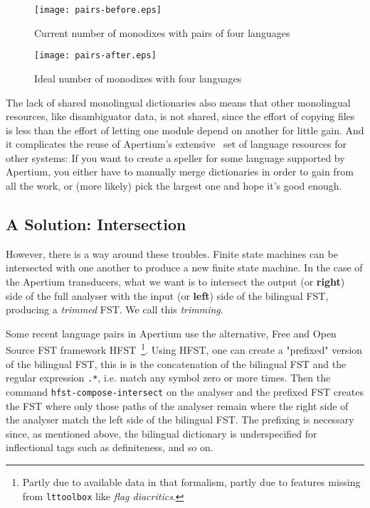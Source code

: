 \documentclass[10pt, a4paper]{article}
\newcommand{\tool}[1]{\texttt{#1}}
\begin{document}
\begin{figure}[h]
  \begin{center}
    \texttt{[image: pairs-before.eps]}
    \caption{Current number of monodixes with pairs of four languages}
    \label{fig.1}
  \end{center}
\end{figure}


\begin{figure}[h]
  \begin{center}
    \texttt{[image: pairs-after.eps]}
    \caption{Ideal number of monodixes with four languages}
    \label{fig.1}
  \end{center}
\end{figure}

The lack of shared monolingual dictionaries also means that other
monolingual resources, like disambiguator data, is not shared, since
the effort of copying files is less than the effort of letting one
module depend on another for little gain. And it complicates the reuse
of Apertium's extensive~\cite{tyers2010fosresources} set of language
resources for other systems: If you want to create a speller for some
language supported by Apertium, you either have to manually merge
dictionaries in order to gain from all the work, or (more likely) pick
the largest one and hope it's good enough.

\subsection{A Solution: Intersection}
\label{sec:solution}

However, there is a way around these troubles. Finite state machines
can be intersected with one another to produce a new finite state
machine. In the case of the Apertium transducers, what we want is to
intersect the output (or \textbf{right}) side of the full analyser
with the input (or \textbf{left}) side of the bilingual FST, producing
a \emph{trimmed} FST. We call this \emph{trimming}.

Some recent language pairs in Apertium use the alternative, Free and
Open Source FST framework HFST~\cite{linden2011hfst}\footnote{Partly
  due to available data in that formalism, partly due to features
  missing from \tool{lttoolbox} like \emph{flag diacritics}.}. Using
HFST, one can create a "prefixed" version of the bilingual FST, this
is is the concatenation of the bilingual FST and the regular
expression \texttt{.*}, i.e. match any symbol zero or more times. Then
the command \tool{hfst-compose-intersect} on the analyser and the
prefixed FST creates the FST where only those paths of the analyser
remain where the right side of the analyser match the left side of the
bilingual FST. The prefixing is necessary since, as mentioned above,
the bilingual dictionary is underspecified for inflectional tags such
as definiteness, and so on.
\end{document}
